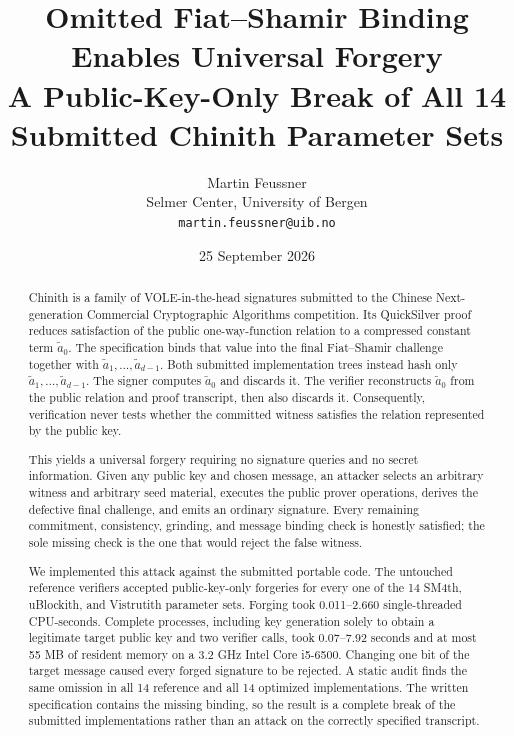\documentclass[11pt,a4paper]{article}
\title{\bfseries Omitted Fiat--Shamir Binding Enables Universal Forgery\\
\large A Public-Key-Only Break of All 14 Submitted Chinith Parameter Sets}
\author{Martin Feussner\\
\small Selmer Center, University of Bergen\\
\small \texttt{martin.feussner@uib.no}}
\date{25 September 2026}
\begin{document}
\maketitle

\begin{center}
\end{center}
\vspace{0.7em}

\begin{abstract}
Chinith is a family of VOLE-in-the-head signatures submitted to the Chinese
Next-generation Commercial Cryptographic Algorithms competition.  Its
QuickSilver proof reduces satisfaction of the public one-way-function
relation to a compressed constant term $\widetilde a_0$.  The specification
binds that value into the final Fiat--Shamir challenge together with
$\widetilde a_1,\ldots,\widetilde a_{d-1}$.  Both submitted implementation
trees instead hash only $\widetilde a_1,\ldots,\widetilde a_{d-1}$.  The
signer computes $\widetilde a_0$ and discards it.  The verifier reconstructs
$\widetilde a_0$ from the public relation and proof transcript, then also
discards it.  Consequently, verification never tests whether the committed
witness satisfies the relation represented by the public key.

This yields a universal forgery requiring no signature queries and no secret
information.  Given any public key and chosen message, an attacker selects an
arbitrary witness and arbitrary seed material, executes the public prover
operations, derives the defective final challenge, and emits an ordinary
signature.  Every remaining commitment, consistency, grinding, and message
binding check is honestly satisfied; the sole missing check is the one that
would reject the false witness.

We implemented this attack against the submitted portable code.  The
untouched reference verifiers accepted public-key-only forgeries for every one
of the 14 SM4th, uBlockith, and Vistrutith parameter sets.  Forging took
0.011--2.660 single-threaded CPU-seconds.  Complete processes, including key
generation solely to obtain a legitimate target public key and two verifier
calls, took 0.07--7.92 seconds and at most 55 MB of resident memory on a
3.2 GHz Intel Core i5-6500.  Changing one bit of the target message caused
every forged signature to be rejected.  A static audit finds the same omission
in all 14 reference and all 14 optimized implementations.  The written
specification contains the missing binding, so the result is a complete break
of the submitted implementations rather than an attack on the correctly
specified transcript.
\end{abstract}
\end{document}
